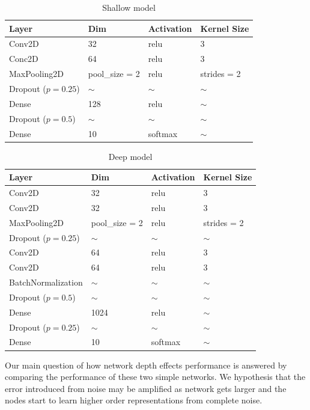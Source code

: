 \documentclass[12pt]{report}
\begin{document}
\begin{table}[H]
  \centering
  \begin{tabular}{llll}
    \toprule
    Layer                & Dim            & Activation & Kernel Size \\
    \midrule
    Conv2D               & 32             & relu       & 3           \\
    Conc2D               & 64             & relu       & 3           \\
    MaxPooling2D         & pool\_size = 2 & relu       & strides = 2 \\
    Dropout ($p = 0.25$) & $\sim$         & $\sim$     & $\sim$      \\
    Dense                & 128            & relu       & $\sim$      \\
    Dropout ($p = 0.5$)  & $\sim$         & $\sim$     & $\sim$      \\
    Dense                & 10             & softmax    & $\sim$      \\
    \bottomrule
  \end{tabular}
  \caption{Shallow model}
\end{table}
\begin{table}[H]
  \centering
  \begin{tabular}{llll}
    \toprule
    Layer                & Dim            & Activation & Kernel Size \\
    \midrule
    Conv2D               & 32             & relu       & 3           \\
    Conv2D               & 32             & relu       & 3           \\
    MaxPooling2D         & pool\_size = 2 & relu       & strides = 2 \\
    Dropout ($p = 0.25$) & $\sim$         & $\sim$     & $\sim$      \\
    Conv2D               & 64             & relu       & 3           \\
    Conv2D               & 64             & relu       & 3           \\
    BatchNormalization   & $\sim$         & $\sim$     & $\sim$      \\
    Dropout ($p = 0.5$)  & $\sim$         & $\sim$     & $\sim$      \\
    Dense                & 1024           & relu       & $\sim$      \\
    Dropout ($p = 0.25$) & $\sim$         & $\sim$     & $\sim$      \\
    Dense                & 10             & softmax    & $\sim$      \\
    \bottomrule
  \end{tabular}
  \caption{Deep model}
\end{table}
Our main question of how network depth effects performance is answered by comparing the performance of these two simple networks. We hypothesis that the error introduced from noise may be amplified as network gets larger and the nodes start to learn higher order representations from complete noise. \\\\
\end{document}
